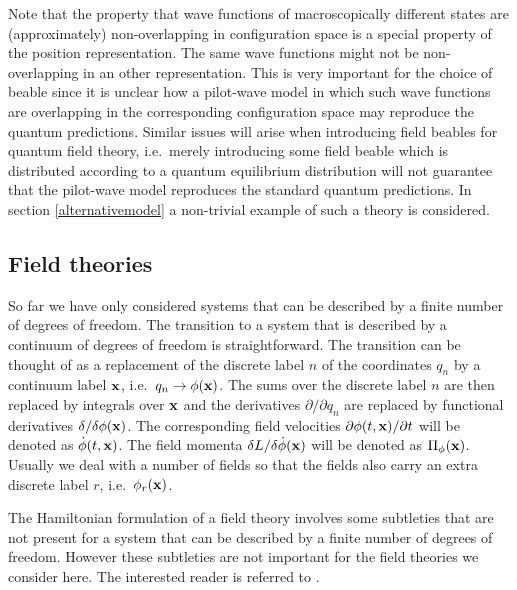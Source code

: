 \documentclass[12pt]{article}
\begin{document}
Note that the property that wave functions of macroscopically different states are (approximately) non-overlapping in configuration space is a special property of the position representation. The same wave functions might not be non-overlapping in an other representation. This is very important for the choice of beable since it is unclear how a pilot-wave model in which such wave functions are overlapping in the corresponding configuration space may reproduce the quantum predictions. Similar issues will arise when introducing field beables for quantum field theory, i.e.\ merely introducing some field beable which is distributed according to a quantum equilibrium distribution will not guarantee that the pilot-wave model reproduces the standard quantum predictions. In section \ref{alternativemodel} a non-trivial example of such a theory is considered. 



\subsection{Field theories}\label{fieldtheories}
So far we have only considered systems that can be described by a finite number of degrees of freedom. The transition to a system that is described by a continuum of degrees of freedom is straightforward. The transition can be thought of as a replacement of the discrete label $n$ of the coordinates $q_n$ by a continuum label ${\bf x}$, i.e.\ $q_n \to  \phi({\bf x})$. The sums over the discrete label $n$ are then replaced by integrals over ${\bf x}$ and the derivatives $\partial / \partial q_n$ are replaced by functional derivatives $\delta / \delta \phi({\bf x})$. The corresponding field velocities $\partial \phi(t,{\bf x})/ \partial t$ will be denoted as ${\dot \phi}(t,{\bf x})$. The field momenta $\delta L/ \delta {\dot \phi}({\bf x})$ will be denoted as $\Pi_{\phi}({\bf x}) $. Usually we deal with a number of fields so that the fields also carry an extra discrete label $r$, i.e.\ $\phi_r({\bf x})$.

The Hamiltonian formulation of a field theory involves some subtleties that are not present for a system that can be described by a finite number of degrees of freedom. However these subtleties are not important for the field theories we consider here. The interested reader is referred to \cite{hanson76,sundermeyer82,gitman90,henneaux91}. 
\end{document}
